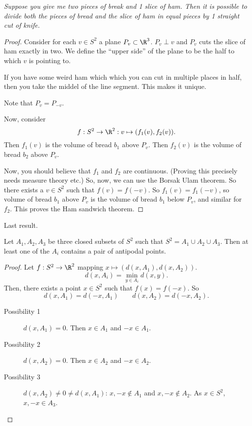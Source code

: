 \begin{theorem}
    \emph{Suppose you give me two pieces of break and 1 slice of ham. Then it is possible to divide both the pieces of bread and the slice of ham in equal pieces by 1 straight cut of knife.}
\end{theorem}
\begin{proof}
    Consider for each $v \in S^{2}$ a plane $P_v \subset \R^3$.
    $P_v \perp v$ and  $P_v$ cuts the slice of ham exactly in two.
    We define the ``upper side'' of the plane to be the half to which $v$ is pointing to.

    If you have some weird ham which which you can cut in multiple places in half, then you take the middel of the line segment. This makes it unique.

    Note that $P_v = P_{-v}$.
\begin{figure}[H]
    \centering
    \label{fig:ham-sandwich-theorem}
\end{figure}

Now, consider 
\[
    f: S^{2} \to  \R^2: v \mapsto (f_1(v), f_2(v))
.\] 
Then $f_1(v)$ is the volume of bread $b_1$ above $P_v$.
Then $f_2(v)$ is the volume of bread $b_2$ above $P_v$.

Now, you should believe that $f_1$ and $f_2$ are continuous. (Proving this precisely needs measure theory etc.)
So, now, we can use the Borsak Ulam theorem.
So there exists a $v \in S^{2}$ such that $f(v) = f(-v)$.
So  $f_1(v) = f_1(-v)$, so volume of bread $b_1$ above $P_v$ is the volume of bread $b_1$ below $P_v$, and similar for  $f_2$.
This proves the Ham sandwich theorem.
\end{proof}

Last result.
\begin{theorem}
    Let $A_1, A_2, A_3$ be three closed subsets of $S^2$ such that $S^2 = A_1 \cup A_2 \cup A_3$.
    Then at least one of the $A_i$ contains a pair of antipodal points.
\end{theorem}
\begin{proof}
    Let $f: S^2 \to \R^2$ mapping $ x\mapsto (d(x, A_1), d(x, A_2))$.
    \[
        d(x, A_i) = \min_{y \in A_i} d(x, y)
    .\] 
    Then, there exists a point $x \in S^2$ such that $f(x) = f(-x)$.
    So
     \[
         d(x, A_1) = d(-x, A_1) \qquad d(x, A_2) = d(-x, A_2)
    .\] 
    \begin{description}
        \item[Possibility 1] $d(x, A_1) = 0$. Then $x \in A_1$ and $-x \in A_1$.
        \item[Possibility 2] $d(x, A_2) = 0$. Then $x \in A_2$ and $-x \in A_2$.
        \item[Possibility 3] $d(x, A_2) \neq 0 \neq d(x, A_1)$: $x, -x \not\in A_1$ and $x, -x \not\in A_2$. As $x \in S^2$, $x, -x \in A_3$.
    \end{description}
\end{proof}

